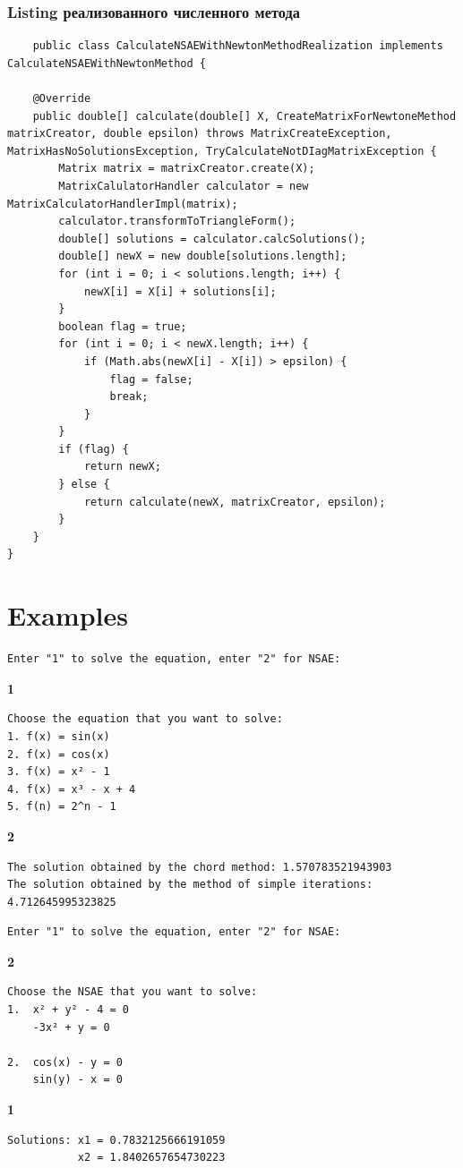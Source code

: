 \subsubsection{Listing реализованного численного метода}
\tiny
\begin{verbatim}
    public class CalculateNSAEWithNewtonMethodRealization implements CalculateNSAEWithNewtonMethod {
    
    @Override
    public double[] calculate(double[] X, CreateMatrixForNewtoneMethod matrixCreator, double epsilon) throws MatrixCreateException, MatrixHasNoSolutionsException, TryCalculateNotDIagMatrixException {
        Matrix matrix = matrixCreator.create(X);
        MatrixCalulatorHandler calculator = new MatrixCalculatorHandlerImpl(matrix);
        calculator.transformToTriangleForm();
        double[] solutions = calculator.calcSolutions();
        double[] newX = new double[solutions.length];
        for (int i = 0; i < solutions.length; i++) {
            newX[i] = X[i] + solutions[i];
        }
        boolean flag = true;
        for (int i = 0; i < newX.length; i++) {
            if (Math.abs(newX[i] - X[i]) > epsilon) {
                flag = false;
                break;
            }
        }
        if (flag) {
            return newX;
        } else {
            return calculate(newX, matrixCreator, epsilon);
        }
    }
}
\end{verbatim}
\normalsize


\section{Examples}
\tiny
\begin{verbatim}
Enter "1" to solve the equation, enter "2" for NSAE:
\end{verbatim}\textbf{1}\begin{verbatim}
Choose the equation that you want to solve:
1. f(x) = sin(x)
2. f(x) = cos(x)
3. f(x) = x² - 1
4. f(x) = x³ - x + 4
5. f(n) = 2^n - 1
\end{verbatim}
\textbf{2}
\begin{verbatim}
The solution obtained by the chord method: 1.570783521943903
The solution obtained by the method of simple iterations: 4.712645995323825
\end{verbatim}

\begin{verbatim}
Enter "1" to solve the equation, enter "2" for NSAE:
\end{verbatim} \textbf{2} \begin{verbatim}
Choose the NSAE that you want to solve:
1.  x² + y² - 4 = 0
    -3x² + y = 0

2.  cos(x) - y = 0
    sin(y) - x = 0
\end{verbatim}
\textbf{1}
\begin{verbatim}
Solutions: x1 = 0.7832125666191059
           x2 = 1.8402657654730223
\end{verbatim}
\normalsize


